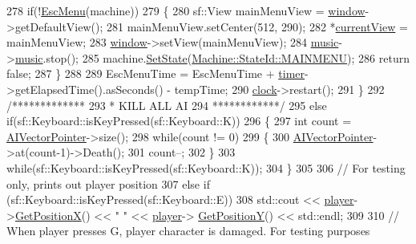 \begin{DoxyCode}
278         \textcolor{keywordflow}{if}(!\hyperlink{classTestApp_a8be9a4cd8c6569abb8aa55f992db3171}{EscMenu}(machine))
279         \{
280             sf::View mainMenuView = \hyperlink{classTestApp_a0b6b080a777092db64519ef7c4309105}{window}->getDefaultView();
281             mainMenuView.setCenter(512, 290);
282             *\hyperlink{classTestApp_ae638230755c6ce4c99ce5f0376f67302}{currentView} = mainMenuView;
283             \hyperlink{classTestApp_a0b6b080a777092db64519ef7c4309105}{window}->setView(mainMenuView);
284             \hyperlink{classTestApp_a0aab55007364bd9b7c45a914feafd166}{music}->\hyperlink{classMusic_a5b300a70ca62ec94d0e41c71bc0f9e40}{music}.stop();
285             machine.\hyperlink{classMachine_abe967397f2de76335bd90ab7aabd8f9f}{SetState}(\hyperlink{classMachine_a5fb0c119d231dd1bfe1dd2c9ca533520a3287971e79b4dca11067ed287847c1e6}{Machine::StateId::MAINMENU});
286             \textcolor{keywordflow}{return} \textcolor{keyword}{false};
287         \}
288 
289         EscMenuTime = EscMenuTime + \hyperlink{classTestApp_aa0f4ce165f864c08bee05f1e5b94f295}{timer}->getElapsedTime().asSeconds() - tempTime;
290         \hyperlink{classTestApp_a270d3cec0f81d6522f1fc1dc4b870cb5}{clock}->restart();
291     \}
292     \textcolor{comment}{/*************}
293 \textcolor{comment}{    * KILL ALL AI}
294 \textcolor{comment}{    ************/}
295     \textcolor{keywordflow}{else} \textcolor{keywordflow}{if}(sf::Keyboard::isKeyPressed(sf::Keyboard::K))
296     \{
297         \textcolor{keywordtype}{int} count = \hyperlink{classTestApp_ac409d674f567c5d2ea773bd7ec3036d9}{AIVectorPointer}->size();
298         \textcolor{keywordflow}{while}(count != 0)
299         \{
300             \hyperlink{classTestApp_ac409d674f567c5d2ea773bd7ec3036d9}{AIVectorPointer}->at(count-1)->Death();
301             count--;
302         \}
303         \textcolor{keywordflow}{while}(sf::Keyboard::isKeyPressed(sf::Keyboard::K));
304     \}
305 
306         \textcolor{comment}{// For testing only, prints out player position}
307     \textcolor{keywordflow}{else} \textcolor{keywordflow}{if} (sf::Keyboard::isKeyPressed(sf::Keyboard::E))
308         std::cout << \hyperlink{classTestApp_a72c21fba56a65699606328b9e765d6db}{player}->\hyperlink{classPlayerObject_aa84a7779304b680fa32b88b01ba95d02}{GetPositionX}() << \textcolor{stringliteral}{" "} << \hyperlink{classTestApp_a72c21fba56a65699606328b9e765d6db}{player}->
      \hyperlink{classPlayerObject_ad17b9ec44299f4dc9ca20064c883496b}{GetPositionY}() << std::endl;
309 
310         \textcolor{comment}{// When player presses G, player character is damaged. For testing purposes}

\end{DoxyCode}
